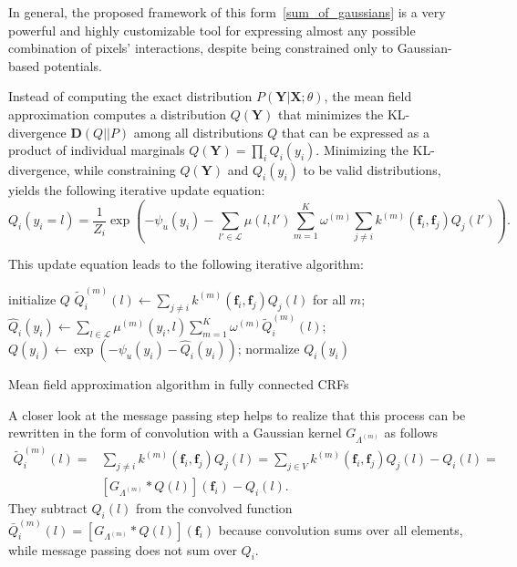 In general, the proposed  framework of this form~\eqref{sum_of_gaussians} is a very powerful and highly customizable tool for
expressing almost any possible combination of pixels' interactions, despite being constrained only to Gaussian-based potentials.

Instead of computing the exact distribution $P(\mathbf{Y} | \mathbf{X}; \theta)$, the mean field approximation computes a
distribution $Q(\mathbf{Y})$ that minimizes the KL-divergence $\mathbf{D}(Q || P)$ among all distributions $Q$ that can be
expressed as a product of individual marginals $Q(\mathbf{Y}) = \prod_i Q_i(y_i)$. Minimizing the KL-divergence, while
constraining $Q(\mathbf{Y})$ and $Q_i(y_i)$ to be valid distributions, yields the following iterative update equation:
\begin{equation}
 Q_i(y_i = l) = \frac{1}{Z_i} \exp{\left( -\psi_u(y_i) - \sum_{l' \in \mathcal{L}}\mu(l, l')\sum_{m=1}^K\omega^{(m)}\sum_{j \neq i}k^{(m)}(\mathbf{f}_i, \mathbf{f}_j)Q_j(l') \right)}.
\end{equation}

This update equation leads to the following iterative algorithm:

\begin{algorithm}
 \SetAlgoLined
 initialize $Q$\;
 {
  $\tilde{Q}_i^{(m)}(l) \leftarrow \sum_{j \neq i}k^{(m)}(\mathbf{f}_i, \mathbf{f}_j)Q_j(l)$ for all $m$;
  $\hat{Q}_i(y_i) \leftarrow \sum_{l \in \mathcal{L}}\mu^{(m)}(y_i, l)\sum_{m=1}^K\omega^{(m)}\tilde{Q}_i^{(m)}(l)$;
  $Q(y_i) \leftarrow \exp{\left( -\psi_u(y_i) - \hat{Q}_i(y_i) \right)}$;
  normalize $Q_i(y_i)$\;
 }
 \caption{Mean field approximation algorithm in fully connected CRFs}
\end{algorithm}

A closer look at the message passing step helps to realize that this process can be rewritten in the form of convolution
with a Gaussian kernel $G_{\Lambda^{(m)}}$ as follows
\begin{align}
 \tilde{Q}_i^{(m)}(l) = &\sum_{j \neq i}k^{(m)}(\mathbf{f}_i, \mathbf{f}_j)Q_j(l) = \sum_{j \in V}k^{(m)}(\mathbf{f}_i, \mathbf{f}_j)Q_j(l) - Q_i(l) = \nonumber \\
 &\left[G_{\Lambda^{(m)}} \ast Q(l)\right](\mathbf{f}_i) - Q_i(l).
\end{align}
They subtract $Q_i(l)$ from the convolved function $\bar{Q}_i^{(m)}(l) = \left[G_{\Lambda^{(m)}} \ast Q(l)\right](\mathbf{f}_i)$ because convolution sums over all elements,
while message passing does not sum over $Q_i$.

